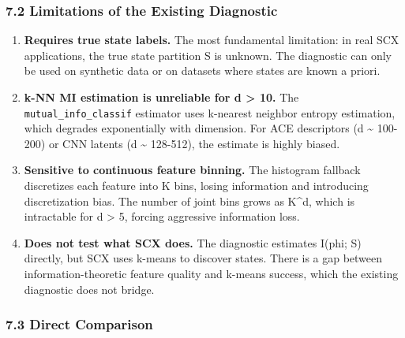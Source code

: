 \documentclass[
  12pt,
]{ctexart}
\begin{document}
\subsubsection{7.2 Limitations of the Existing
Diagnostic}\label{limitations-of-the-existing-diagnostic}

\begin{enumerate}
\def\labelenumi{\arabic{enumi}.}
\item
  \textbf{Requires true state labels.} The most fundamental limitation:
  in real SCX applications, the true state partition S is unknown. The
  diagnostic can only be used on synthetic data or on datasets where
  states are known a priori.
\item
  \textbf{k-NN MI estimation is unreliable for d \textgreater{} 10.} The
  \texttt{mutual\_info\_classif} estimator uses k-nearest neighbor
  entropy estimation, which degrades exponentially with dimension. For
  ACE descriptors (d \textasciitilde{} 100-200) or CNN latents (d
  \textasciitilde{} 128-512), the estimate is highly biased.
\item
  \textbf{Sensitive to continuous feature binning.} The histogram
  fallback discretizes each feature into K bins, losing information and
  introducing discretization bias. The number of joint bins grows as
  K\^{}d, which is intractable for d \textgreater{} 5, forcing
  aggressive information loss.
\item
  \textbf{Does not test what SCX does.} The diagnostic estimates I(phi;
  S) directly, but SCX uses k-means to discover states. There is a gap
  between information-theoretic feature quality and k-means success,
  which the existing diagnostic does not bridge.
\end{enumerate}

\subsubsection{7.3 Direct Comparison}\label{direct-comparison}
\end{document}
